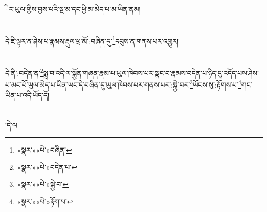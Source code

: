 ིར་ཡུལ་གྱིས་བྱས་པའི་སྔ་མ་དང་ཕྱི་མ་མེད་པ་མ་ཡིན་ནམ།\chapter{ }དེ་ཇི་ལྟར་ན་ཤེས་པ་རྣམས་རྡུལ་ཕྲ་མོ་:བཞིན་དུ་\footnote{«སྣར་»«པེ་»བཞིན་}དབུས་ན་གནས་པར་འགྱུར།\chapter{ }དེ་ནི་:བདེན་ན་\footnote{«སྣར་»«པེ་»བདེན་པ་}སྨྲ་བ་འདི་ལ་སྐྱོན་གཞན་རྣམ་པ་ཡུལ་ཁེབས་པར་སྣང་བ་རྣམས་བདེན་པ་ཉིད་དུ་འདོད་པས་ཤེས་པ་མང་པོ་ཡུལ་མེད་པ་ཡིན་ཡང་དེ་བཞིན་དུ་ཡུལ་ཁེབས་པར་གནས་པར་:སྐྱེ་བར་\footnote{«སྣར་»«པེ་»སྐྱེ་བ་}ཡོངས་སུ་:རྟོགས་པ་\footnote{«སྣར་»«པེ་»རྟོག་པ་}གང་ཡིན་པ་འདི་ཡོད་དོ།\chapter{ }།དེ་ལ